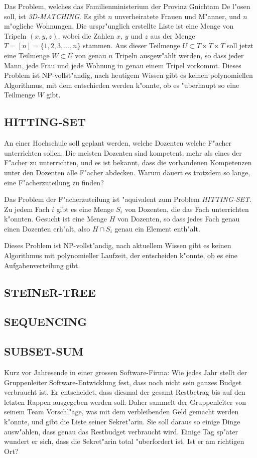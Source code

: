 \medskip

Das Problem, welches das Familienministerium der Provinz Gnichtam De
l"osen soll, ist {\it 3D-MATCHING}. Es gibt $n$ unverheiratete Frauen
und M"anner, und $n$ m"ogliche Wohnungen. Die urspr"unglich erstellte
Liste ist eine Menge von Tripeln $(x,y,z)$, wobei die Zahlen $x$,
$y$ und $z$ aus der Menge $T=[n]=\{1,2,3,\dots,n\}$ stammen. Aus dieser
Teilmenge $U\subset T\times T\times T$ soll jetzt eine 
Teilmenge $W\subset U$ von genau $n$ Tripeln ausgew"ahlt werden, so dass
jeder Mann, jede Frau und jede Wohnung in genau einem Tripel vorkommt.
Dieses Problem ist NP-vollst"andig, 
nach heutigem Wissen gibt es keinen polynomiellen Algorithmus,
mit dem entschieden werden k"onnte, ob es "uberhaupt so eine Teilmenge
$W$ gibt.

\subsection{HITTING-SET}
An einer Hochschule soll geplant werden, welche Dozenten welche
F"acher unterrichten sollen.
Die meisten Dozenten sind kompetent, mehr als eines der F"acher
zu unterrichten, und es ist bekannt, dass die vorhandenen Kompetenzen
unter den Dozenten alle F"acher abdecken.
Warum dauert es trotzdem so lange, eine F"acherzuteilung zu finden? 

\medskip

Das Problem der F"acherzuteilung ist "aquivalent zum Problem {\it HITTING-SET}.
Zu jedem Fach $i$ gibt es eine Menge $S_i$ von Dozenten, die das Fach
unterrichten k"onnten.
Gesucht ist eine Menge $H$ von Dozenten, so dass jedes Fach genau
einen Dozenten erh"alt, also $H\cap S_i$ genau ein Element enth"alt.

Dieses Problem ist NP-vollst"andig, nach aktuellem Wissen gibt es
keinen Algorithmus mit polynomieller Laufzeit, der entscheiden
k"onnte, ob es eine Aufgabenverteilung gibt.

\subsection{STEINER-TREE}


\subsection{SEQUENCING}


\subsection{SUBSET-SUM}
Kurz vor Jahresende in einer grossen Software-Firma: Wie jedes Jahr stellt
der Gruppenleiter Software-Entwicklung fest, dass noch nicht sein ganzes
Budget verbraucht ist.  Er entscheidet, dass diesmal der gesamt Restbetrag
bis auf den letzten Rappen
ausgegeben werden soll.  Daher sammelt der Gruppenleiter von seinem
Team Vorschl"age, was mit dem verbleibenden Geld gemacht werden k"onnte,
und gibt die Liste seiner Sekret"arin.  Sie soll daraus so einige Dinge
ausw"ahlen, dass genau das Restbudget verbraucht wird. Einige Tag sp"ater
wundert er sich, dass die Sekret"arin total "uberfordert ist. Ist er
am richtigen Ort?

